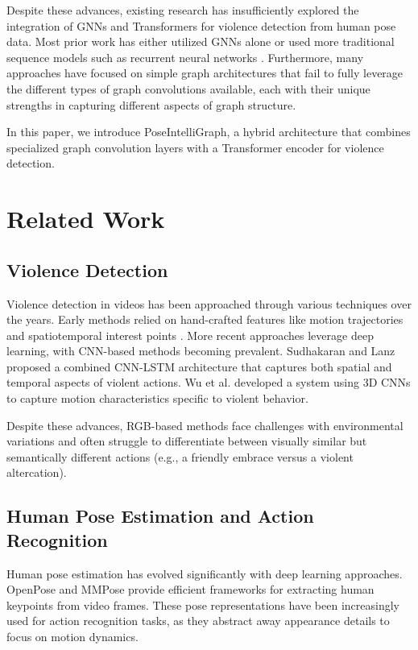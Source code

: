 \documentclass[conference]{IEEEtran}
\begin{document}
Despite these advances, existing research has insufficiently explored the
integration of GNNs and Transformers for violence detection from human pose
data. Most prior work has either utilized GNNs alone \cite{yan2018spatial} or
used more traditional sequence models such as recurrent neural networks
\cite{li2019actional}. Furthermore, many approaches have focused on simple
graph architectures that fail to fully leverage the different types of graph
convolutions available, each with their unique strengths in capturing different
aspects of graph structure.

In this paper, we introduce PoseIntelliGraph, a hybrid architecture that
combines specialized graph convolution layers with a Transformer encoder for
violence detection.

\section{Related Work}
\subsection{Violence Detection}
Violence detection in videos has been approached through various techniques
over the years. Early methods relied on hand-crafted features like motion
trajectories and spatiotemporal interest points \cite{nievas2011violence}. More
recent approaches leverage deep learning, with CNN-based methods becoming
prevalent. Sudhakaran and Lanz \cite{sudhakaran2017learning} proposed a
combined CNN-LSTM architecture that captures both spatial and temporal aspects
of violent actions. Wu et al. \cite{wu2020not} developed a system using 3D CNNs
to capture motion characteristics specific to violent behavior.

Despite these advances, RGB-based methods face challenges with environmental
variations and often struggle to differentiate between visually similar but
semantically different actions (e.g., a friendly embrace versus a violent
altercation).

\subsection{Human Pose Estimation and Action Recognition}
Human pose estimation has evolved significantly with deep learning approaches.
OpenPose \cite{cao2017realtime} and MMPose \cite{mmpose2020} provide efficient
frameworks for extracting human keypoints from video frames. These pose
representations have been increasingly used for action recognition tasks, as
they abstract away appearance details to focus on motion dynamics.
\end{document}
